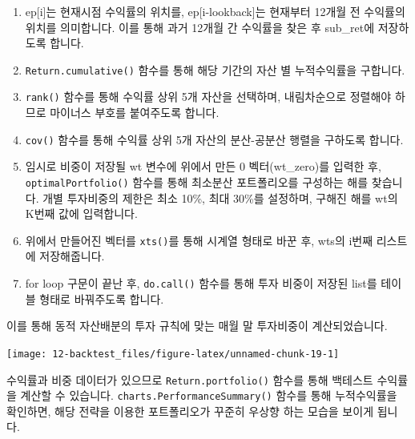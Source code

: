 \documentclass[12pt,]{book}
\newenvironment{Shaded}{\begin{snugshade}}{\end{snugshade}}
\newcommand{\DataTypeTok}[1]{\textcolor[rgb]{0.13,0.29,0.53}{#1}}
\newcommand{\KeywordTok}[1]{\textcolor[rgb]{0.13,0.29,0.53}{\textbf{#1}}}
\newcommand{\NormalTok}[1]{#1}
\newcommand{\OperatorTok}[1]{\textcolor[rgb]{0.81,0.36,0.00}{\textbf{#1}}}
\newcommand{\OtherTok}[1]{\textcolor[rgb]{0.56,0.35,0.01}{#1}}
\newcommand{\StringTok}[1]{\textcolor[rgb]{0.31,0.60,0.02}{#1}}
\providecommand{\tightlist}{%
  \setlength{\itemsep}{0pt}\setlength{\parskip}{0pt}}
\begin{document}
\begin{enumerate}
\def\labelenumi{\arabic{enumi}.}
\tightlist
\item
  ep{[}i{]}는 현재시점 수익률의 위치를, ep{[}i-lookback{]}는 현재부터 12개월 전 수익률의 위치를 의미합니다. 이를 통해 과거 12개월 간 수익률을 찾은 후 sub\_ret에 저장하도록 합니다.
\item
  \texttt{Return.cumulative()} 함수를 통해 해당 기간의 자산 별 누적수익률을 구합니다.
\item
  \texttt{rank()} 함수를 통해 수익률 상위 5개 자산을 선택하며, 내림차순으로 정렬해야 하므로 마이너스 부호를 붙여주도록 합니다.
\item
  \texttt{cov()} 함수를 통해 수익률 상위 5개 자산의 분산-공분산 행렬을 구하도록 합니다.
\item
  임시로 비중이 저장될 wt 변수에 위에서 만든 0 벡터(wt\_zero)를 입력한 후, \texttt{optimalPortfolio()} 함수를 통해 최소분산 포트폴리오를 구성하는 해를 찾습니다. 개별 투자비중의 제한은 최소 10\%, 최대 30\%를 설정하며, 구해진 해를 wt의 K번째 값에 입력합니다.
\item
  위에서 만들어진 벡터를 \texttt{xts()}를 통해 시계열 형태로 바꾼 후, wts의 i번째 리스트에 저장해줍니다.
\item
  for loop 구문이 끝난 후, \texttt{do.call()} 함수를 통해 투자 비중이 저장된 list를 테이블 형태로 바꿔주도록 합니다.
\end{enumerate}

이를 통해 동적 자산배분의 투자 규칙에 맞는 매월 말 투자비중이 계산되었습니다.

\begin{Shaded}
\end{Shaded}

\begin{center}\texttt{[image: 12-backtest\_files/figure-latex/unnamed-chunk-19-1]} \end{center}

수익률과 비중 데이터가 있으므로 \texttt{Return.portfolio()} 함수를 통해 백테스트 수익률을 계산할 수 있습니다. \texttt{charts.PerformanceSummary()} 함수를 통해 누적수익률을 확인하면, 해당 전략을 이용한 포트폴리오가 꾸준히 우상향 하는 모습을 보이게 됩니다.
\end{document}
